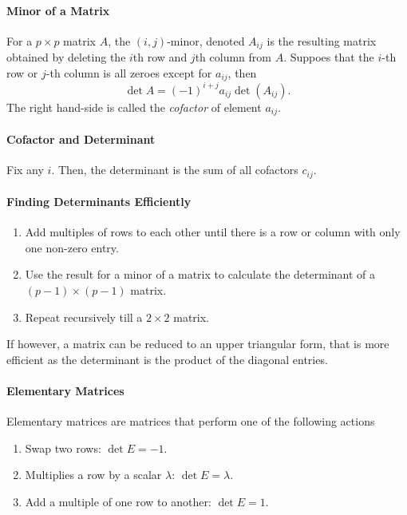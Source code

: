 \paragraph{Minor of a Matrix}
For a \( p\times p \) matrix \( A \), the \((i,j)\)-minor,
denoted \( A_{ij} \) is the resulting matrix obtained by deleting the \(i\)th row and \(j\)th column from \( A \).
Suppoes that the \( i \)-th row or \( j \)-th column is
all zeroes except for \( a_{ij} \), then \[
    \det A = {(-1)}^{i + j} a_{ij} \det(A_{ij})
.\]
The right hand-side is called the \textit{cofactor}
of element \( a_{ij} \).

\paragraph{Cofactor and Determinant}
Fix any \( i \). Then, the determinant is the sum of all
cofactors \( c_{ij} \).
 
\paragraph{Finding Determinants Efficiently}
\begin{enumerate}
    \item Add multiples of rows to each other until there
    is a row or column with only one non-zero entry.
    \item Use the result for a minor of a matrix to
        calculate the determinant of a \( (p-1)\times(p-1) \)
        matrix.
    \item Repeat recursively till a \( 2\times 2 \) matrix.
\end{enumerate}
If however, a matrix can be reduced to an upper triangular form,
that is more efficient as the determinant is the product
of the diagonal entries.

\paragraph{Elementary Matrices}
Elementary matrices are matrices that perform one of the following actions
\begin{enumerate}
    \item Swap two rows: \( \det E = -1 \).
    \item Multiplies a row by a scalar \( \lambda \): \( \det E = \lambda \).
    \item Add a multiple of one row to another: \( \det E = 1 \).
\end{enumerate}

